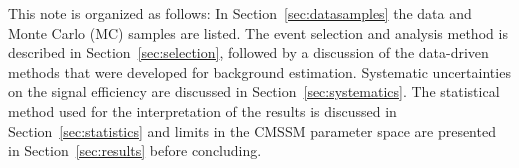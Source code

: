 This note is organized as follows: In Section~\ref{sec:datasamples}
the data and Monte Carlo (MC) samples are listed. The event selection
and analysis method is described in Section~\ref{sec:selection},
followed by a discussion of the data-driven methods that were
developed for background estimation. Systematic uncertainties on the
signal efficiency are discussed in Section~\ref{sec:systematics}. The
statistical method used for the interpretation of the results is
discussed in Section~\ref{sec:statistics} and limits in the CMSSM
parameter space are presented in Section~\ref{sec:results} before
concluding.



